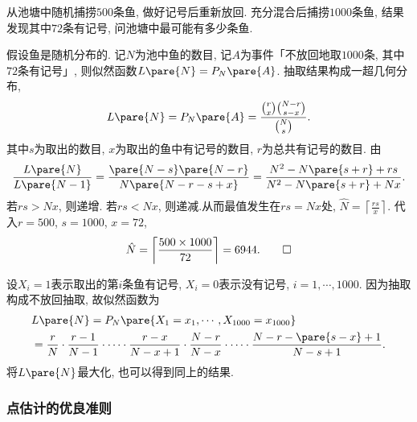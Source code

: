 \documentclass[../Statistics.tex]{subfiles}
\begin{document}
\begin{sample}
    \begin{ex}
        从池塘中随机捕捞$500$条鱼, 做好记号后重新放回. 充分混合后捕捞$1000$条鱼, 结果发现其中$72$条有记号, 问池塘中最可能有多少条鱼.
    \end{ex}
    \begin{solution}
        假设鱼是随机分布的. 记$N$为池中鱼的数目, 记$A$为事件「不放回地取$1000$条, 其中$72$条有记号」, 则似然函数$L\pare{N} = P_N\pare{A}$. 抽取结果构成一超几何分布,
        \[ L\pare{N} = P_N\pare{A} = \frac{\binom{r}{x} \binom{N-r}{s-x}}{\binom{N}{s}}. \]
        其中$s$为取出的数目, $x$为取出的鱼中有记号的数目, $r$为总共有记号的数目. 由
        \[ \frac{L\pare{N}}{L\pare{N-1}} = \frac{\pare{N-s}\pare{N-r}}{N\pare{N-r-s+x}} = \frac{N^2 - N\pare{s+r} + rs}{N^2 - N\pare{s+r} + Nx}. \]
        若$rs > Nx$, 则递增. 若$rs < Nx$, 则递减.从而最值发生在$rs=Nx$处, $\displaystyle \hat N = \left\lceil \frac{rs}{x} \right\rceil$. 
        代入$r=500$, $s=1000$, $x=72$,
        \[ \hat N = \left\lceil \frac{500\times 1000}{72} \right\rceil = 6944. \qedhere \]
    \end{solution}
    \begin{remark}
        设$X_i=1$表示取出的第$i$条鱼有记号, $X_i = 0$表示没有记号, $i = 1,\cdots,1000$. 因为抽取构成不放回抽取, 故似然函数为
        \begin{align*}
            & L\pare{N} = P_N\pare{X_1 = x_1,\cdots, X_{1000} = x_{1000}} \\
            &= \frac{r}{N}\cdot \frac{r-1}{N-1}\cdot \cdots \cdot \frac{r-x}{N-x+1} \cdot \frac{N-r}{N-x} \cdot \cdots \cdot \frac{N-r-\pare{s-x}+1}{N-s+1}.
        \end{align*}
        将$L\pare{N}$最大化, 也可以得到同上的结果.
    \end{remark}
\end{sample}


\subsubsection{点估计的优良准则} %
\label{ssub:点估计的优良准则}
\end{document}
